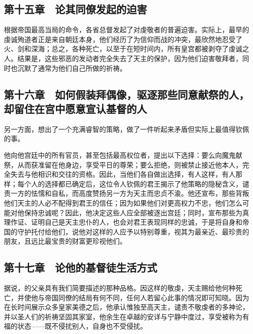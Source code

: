 \subsection{第十五章　论其同僚发起的迫害}

根据帝国最高当局的命令，各省总督发起了对虔敬者的普遍迫害。实际上，最早的虔诚殉道者正是来自朝廷本身，他们经历了为信仰而战的冲突，最欣然地忍受了火、剑和深海；总之，各种死亡，以至于在短时间内，所有皇宫都被剥夺了虔诚之人。结果是，这些邪恶的发动者完全失去了天主的保护，因为他们迫害敬拜者，同时也沉默了通常为他们自己所做的祈祷。\par


\subsection{第十六章　如何假装拜偶像，驱逐那些同意献祭的人，却留住在宫中愿意宣认基督的人}

另一方面，想出了一个充满睿智的策略，做了一件听起来矛盾但实际上最值得钦佩的事。\par

他向他宫廷中的所有官员，甚至包括最高权位者，提出以下选择：要么向魔鬼献祭，从而获准留在他身边，享受平日的尊荣；要么拒绝，则被禁止接近他本人，完全失去与他相识和交往的资格。因此，当他们各自做出选择，有人这样，有人那样；每个人的选择都已确定后，这位令人钦佩的君王揭示了他策略的隐秘含义，谴责一方的怯懦和自私，而高度赞扬另一方为天主而忠贞不渝。他还宣布，那些背叛他们天主的人必不配得到君王的信任；因为如果他们对更高权力不忠，他们怎么可能对他保持忠诚呢？因此，他决定这些人应全部被逐出宫廷；同时，宣布那些为真理作证、证明自己是天主忠仆的人，也会对君王表现同样的忠诚，于是将自身和帝国的守护托付给他们，说他对这样的人应予以特别尊重，视其为最亲近、最珍贵的朋友，且远比最宝贵的财富更珍视他们。\par


\subsection{第十七章　论他的基督徒生活方式}

据说，的父亲具有我们简要描述的那种品格。因这样的敬虔，天主赐给他何种死亡，并使他与帝国同僚的结局有何不同，任何人若留心此事的情况即可知晓。因为在长时间展示众多皇家美德之后，他承认惟独至高天主，谴责不敬虔者的多神论，并以圣人们的祈祷坚固其家室，他余生在卓越的安详与宁静中度过，享受被称为有福的状态——既不侵扰别人，自身也不受侵扰。\par

